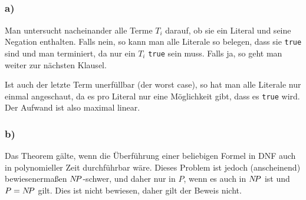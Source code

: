 \documentclass{article}
\begin{document}
\vspace{2\baselineskip}

\subsection{} 

\subsubsection{a)}

Man untersucht nacheinander alle Terme $T_i$ darauf, ob sie ein Literal und
seine Negation enthalten. Falls nein, so kann man alle Literale so belegen, dass
sie \texttt{true} sind und man terminiert, da nur ein $T_i$ \texttt{true} sein
muss. Falls ja, so geht man weiter zur nächsten Klausel.

Ist auch der letzte Term unerfüllbar
(der worst case), so hat man alle Literale nur einmal angeschaut, da es pro
Literal nur eine Möglichkeit gibt, dass es \texttt{true} wird. Der Aufwand ist
also maximal linear.

\subsubsection{b)}

\newcommand{\NP}{N\kern-2ptP}
Das Theorem gälte, wenn die Überführung einer beliebigen Formel in DNF auch in
polynomieller Zeit durchführbar wäre. Dieses Problem ist jedoch (anscheinend)
bewiesenermaßen $\NP$-schwer, und daher nur in $P$, wenn es auch in $\NP$ ist und $P =
\NP$ gilt. Dies ist nicht bewiesen, daher gilt der Beweis nicht.
\subsection{} 
\end{document}
